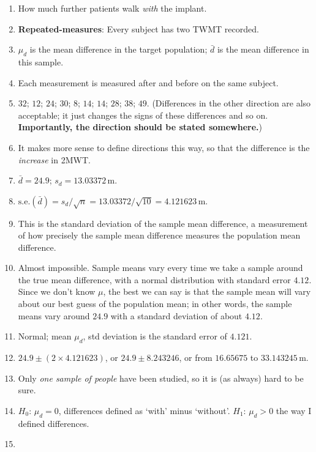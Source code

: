 \documentclass[
  11pt,
  a4paper,
  krantz2]{krantz}
\providecommand{\tightlist}{%
  \setlength{\itemsep}{0pt}\setlength{\parskip}{0pt}}
\begin{document}
\begin{footnotesize}
\begin{enumerate}
\def\labelenumi{\arabic{enumi}.}
\tightlist
\item
  How much further patients walk \emph{with} the implant.
\item
  \textbf{Repeated-measures}:
  Every subject has two TWMT recorded.
\item
  \(\mu_d\) is the mean difference in the target population; \(\bar{d}\) is the mean difference in this sample.
\item
  Each measurement is measured after and before on the same subject.
\item
  \(32\); \(12\); \(24\); \(30\); \(8\); \(14\); \(14\); \(28\); \(38\); \(49\).
  (Differences in the other direction are also acceptable; it just changes the signs of these differences and so on.
  \textbf{Importantly, the direction should be stated somewhere.})
\item
  It makes more sense to define directions this way, so that the difference is the \emph{increase} in 2MWT.
\item
  \(\bar{d} = 24.9\); \(s_d=13.03372\,\text{m}\).
\item
  \(\text{s.e.}(\bar{d}) = s_d/\sqrt{n} = 13.03372/\sqrt{10} = 4.121623\,\text{m}\).
\item
  This is the standard deviation of the sample mean difference, a measurement of how precisely the sample mean difference measures the population mean difference.
\item
  Almost impossible.
  Sample means vary every time we take a sample around the true mean difference, with a normal distribution with standard error \(4.12\).
  Since we don't know \(\mu\), the best we can say is that the sample mean will vary about our best guess of the population mean; in other words, the sample means vary around \(24.9\) with a standard deviation of about \(4.12\).
\item
  Normal; mean \(\mu_d\), std deviation is the standard error of \(4.121\).
\item
  \(24.9\pm (2\times 4.121623)\), or \(24.9\pm 8.243246\), or from \(16.65675\) to \(33.143245\,\text{m}\).
\item
  Only \emph{one sample of people} have been studied, so it is (as always) hard to be sure.
\item
  \(H_0\): \(\mu_d = 0\), differences defined as `with' minus `without'.
  \(H_1\): \(\mu_d > 0\) the way I defined differences.\\
\item

\end{enumerate}
\end{footnotesize}
\end{document}
